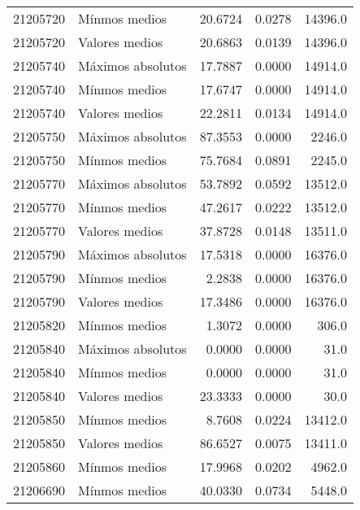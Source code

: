 \begin{longtable}{llrrr}
 21205720 &      Mínmos medios &       20.6724 &         0.0278 &         14396.0 \\
 21205720 &     Valores medios &       20.6863 &         0.0139 &         14396.0 \\
 21205740 &  Máximos absolutos &       17.7887 &         0.0000 &         14914.0 \\
 21205740 &      Mínmos medios &       17.6747 &         0.0000 &         14914.0 \\
 21205740 &     Valores medios &       22.2811 &         0.0134 &         14914.0 \\
 21205750 &  Máximos absolutos &       87.3553 &         0.0000 &          2246.0 \\
 21205750 &      Mínmos medios &       75.7684 &         0.0891 &          2245.0 \\
 21205770 &  Máximos absolutos &       53.7892 &         0.0592 &         13512.0 \\
 21205770 &      Mínmos medios &       47.2617 &         0.0222 &         13512.0 \\
 21205770 &     Valores medios &       37.8728 &         0.0148 &         13511.0 \\
 21205790 &  Máximos absolutos &       17.5318 &         0.0000 &         16376.0 \\
 21205790 &      Mínmos medios &        2.2838 &         0.0000 &         16376.0 \\
 21205790 &     Valores medios &       17.3486 &         0.0000 &         16376.0 \\
 21205820 &      Mínmos medios &        1.3072 &         0.0000 &           306.0 \\
 21205840 &  Máximos absolutos &        0.0000 &         0.0000 &            31.0 \\
 21205840 &      Mínmos medios &        0.0000 &         0.0000 &            31.0 \\
 21205840 &     Valores medios &       23.3333 &         0.0000 &            30.0 \\
 21205850 &      Mínmos medios &        8.7608 &         0.0224 &         13412.0 \\
 21205850 &     Valores medios &       86.6527 &         0.0075 &         13411.0 \\
 21205860 &      Mínmos medios &       17.9968 &         0.0202 &          4962.0 \\
 21206690 &      Mínmos medios &       40.0330 &         0.0734 &          5448.0 \\

\end{longtable}
